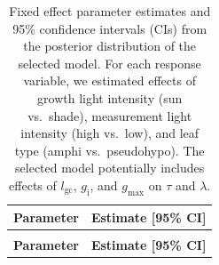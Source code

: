 \documentclass[
  letterpaper,
  DIV=11,
  numbers=noendperiod]{scrartcl}
\newcommand{\gcl}{$l_\mathrm{gc}$}
\newcommand{\gi}{$g_\mathrm{i}$} %
\newcommand{\gmax}{$g_\mathrm{max}$}
\providecommand{\DIFaddbegin}{} %
\newcommand{\DIFaddincludegraphics}[2][]{{\color{blue}\fbox{\DIFOincludegraphics[#1]{#2}}}} %
\DeclareRobustCommand{\DIFaddbegin}{\DIFOaddbegin \let\includegraphics\DIFaddincludegraphics} %
\begin{document}
\DIFaddbegin \clearpage

\begin{longtable}{>{\raggedright\arraybackslash}p{3.75in}>{\raggedright\arraybackslash}p{2in}}

\caption{\label{tbl-fixed}Fixed effect parameter estimates and 95\%
confidence intervals (CIs) from the posterior distribution of the
selected model. For each response variable, we estimated effects of
growth light intensity (sun vs.~shade), measurement light intensity
(high vs.~low), and leaf type (amphi vs.~pseudohypo). The selected model
potentially includes effects of \gcl, \gi{}, and \gmax{} on \(\tau\) and
\(\lambda\).}

\tabularnewline

\toprule
\textbf{Parameter} & \textbf{Estimate [95\% CI]}\\
\midrule
\endfirsthead
\multicolumn{2}{@{}l}{\textit{(continued)}}\\
\toprule
\textbf{Parameter} & \textbf{Estimate [95\% CI]}\\
\midrule
\endhead


\end{longtable}
\end{document}
